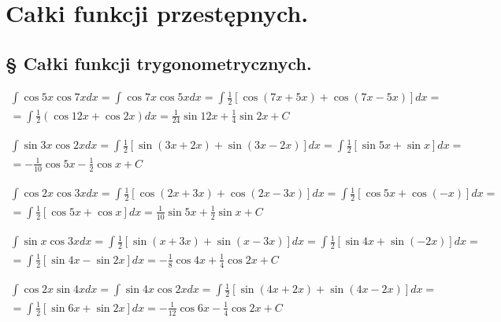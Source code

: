 \section{Całki funkcji przestępnych.}
\subsection{§ Całki funkcji trygonometrycznych.}



\begin{gather*}\int \cos 5x \cos 7x dx = \int \cos 7x \cos 5x dx = \int \frac{1}{2}[\cos(7x+5x)+\cos(7x-5x)]dx =  \\
= \int \frac{1}{2}(\cos 12x + \cos 2x)dx = \frac{1}{24}\sin 12x + \frac{1}{4}\sin 2x + C\end{gather*}



\begin{gather*}\int \sin 3x \cos 2x dx = \int \frac{1}{2}[\sin (3x+2x)+\sin (3x-2x)]dx = \int \frac{1}{2}[\sin 5x + \sin x]dx =  \\
= -\frac{1}{10}\cos 5x - \frac{1}{2}\cos x + C\end{gather*}



\begin{gather*}\int \cos 2x \cos 3x dx = \int \frac{1}{2}[\cos(2x+3x)+\cos(2x-3x)]dx = \int \frac{1}{2}[\cos 5x + \cos (-x)]dx =  \\
= \int \frac{1}{2}[\cos 5x + \cos x]dx = \frac{1}{10}\sin 5x + \frac{1}{2} \sin x + C\end{gather*}



\begin{gather*}\int \sin x \cos 3x dx = \int \frac{1}{2}[\sin (x+3x)+\sin (x-3x)]dx = \int \frac{1}{2}[\sin 4x + \sin (-2x)]dx =  \\
= \int \frac{1}{2}[\sin 4x - \sin 2x]dx = -\frac{1}{8}\cos 4x + \frac{1}{4}\cos 2x + C\end{gather*}



\begin{gather*}\int \cos 2x \sin 4x dx = \int \sin 4x \cos 2x dx = \int \frac{1}{2}[\sin(4x+2x)+\sin(4x-2x)]dx =  \\
= \int \frac{1}{2}[\sin 6x + \sin 2x]dx = -\frac{1}{12}\cos 6x - \frac{1}{4}\cos 2x + C\end{gather*}


